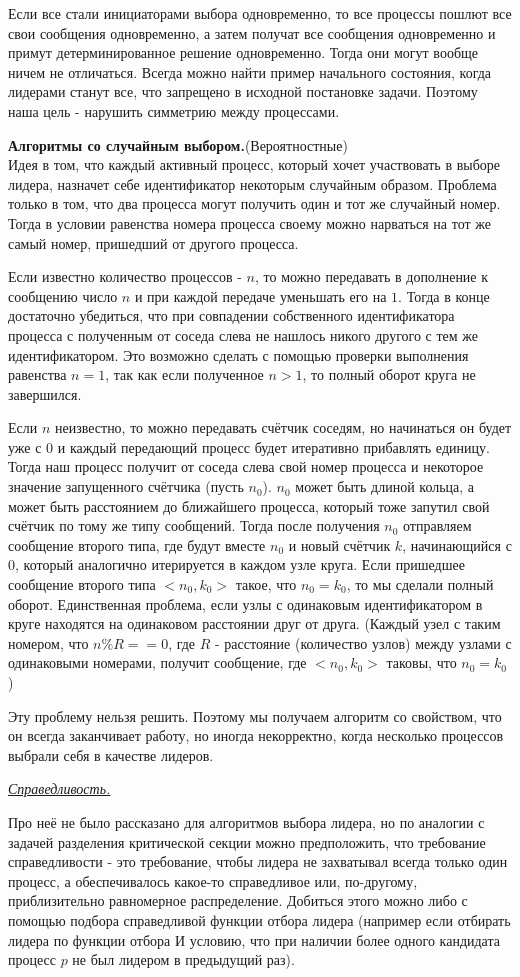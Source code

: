 Если все стали инициаторами выбора одновременно, то все процессы пошлют все свои сообщения одновременно, а затем получат все сообщения одновременно и примут детерминированное решение одновременно. Тогда они могут вообще ничем не отличаться. Всегда можно найти пример начального состояния, когда лидерами станут все, что запрещено в исходной постановке задачи. Поэтому наша цель - нарушить симметрию между процессами.

\textbf{Алгоритмы со случайным выбором.}(Вероятностные)\\
Идея в том, что каждый активный процесс, который хочет участвовать в выборе лидера, назначет себе идентификатор некоторым случайным образом.
Проблема только в том, что два процесса могут получить один и тот же случайный номер. Тогда в условии равенства номера процесса своему можно нарваться на тот же самый номер, пришедший от другого процесса.

Если известно количество  процессов - $n$, то можно передавать в дополнение к сообщению число $n$ и при каждой передаче уменьшать его на $1$. Тогда в конце достаточно убедиться, что при совпадении собственного идентификатора процесса с полученным от соседа слева не нашлось никого другого с тем же идентификатором. Это возможно сделать с помощью проверки выполнения равенства $n = 1$, так как если полученное $n > 1$, то полный оборот круга не завершился.

Если $n$ неизвестно, то можно передавать счётчик соседям, но начинаться он будет уже с $0$ и каждый передающий процесс будет итеративно прибавлять единицу. Тогда наш процесс получит от соседа слева свой номер процесса и некоторое значение запущенного счётчика (пусть $n_0$). $n_0$ может быть длиной кольца, а может быть расстоянием до ближайшего процесса, который тоже запутил свой счётчик по тому же типу сообщений. Тогда после получения $n_0$ отправляем сообщение второго типа, где будут вместе $n_0$ и новый счётчик $k$, начинающийся с $0$, который аналогично итерируется в каждом узле круга. Если пришедшее сообщение второго типа $<n_0, k_0>$ такое, что $n_0 = k_0$, то мы сделали полный оборот. Единственная проблема, если узлы с одинаковым идентификатором в круге находятся на одинаковом расстоянии друг от друга. (Каждый узел с таким номером, что $n \% R == 0$, где $R$ - расстояние (количество узлов) между узлами с одинаковыми номерами, получит  сообщение, где $<n_0, k_0>$ таковы, что $n_0 = k_0$)

Эту проблему нельзя решить. Поэтому мы получаем алгоритм со свойством, что он всегда заканчивает работу, но иногда некорректно, когда несколько процессов выбрали себя в качестве лидеров.
\begin{center}
    \textit{\underline{Справедливость.}}
\end{center}
Про неё не было рассказано для алгоритмов выбора лидера, но по аналогии с задачей разделения критической секции можно предположить, что требование справедливости - это требование, чтобы лидера не захватывал всегда только один процесс, а обеспечивалось какое-то справедливое или, по-другому, приблизительно равномерное распределение. Добиться этого можно либо с помощью подбора справедливой функции отбора лидера (например если отбирать лидера по функции отбора И условию, что при наличии более одного кандидата процесс $p$ не был лидером в предыдущий раз).
